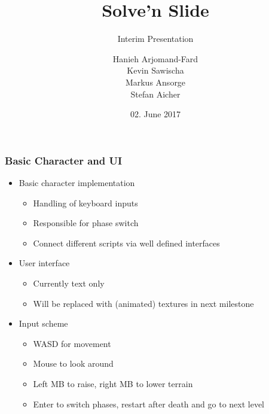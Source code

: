 \documentclass[xcolor=dvipsnames]{beamer}
\title{Solve'n Slide}
\subtitle{Interim Presentation}
\author{Hanieh Arjomand-Fard\\Kevin Sawischa\\Markus Ansorge\\Stefan Aicher}
\date{02. June 2017}
\begin{document}
	\maketitle
	
	\begin{frame}
		\frametitle{Basic Character and UI}
		\begin{itemize}
			\item Basic character implementation
			\begin{itemize}
				\item Handling of keyboard inputs
				\item Responsible for phase switch
				\item Connect different scripts via well defined interfaces
			\end{itemize}
			\item User interface
			\begin{itemize}
				\item Currently text only
				\item Will be replaced with (animated) textures in next milestone
			\end{itemize}
			\item Input scheme
			\begin{itemize}
				\item WASD for movement
				\item Mouse to look around
				\item Left MB to raise, right MB to lower terrain
				\item Enter to switch phases, restart after death and go to next level
			\end{itemize}
		\end{itemize}
	\end{frame}
	
\end{document}
